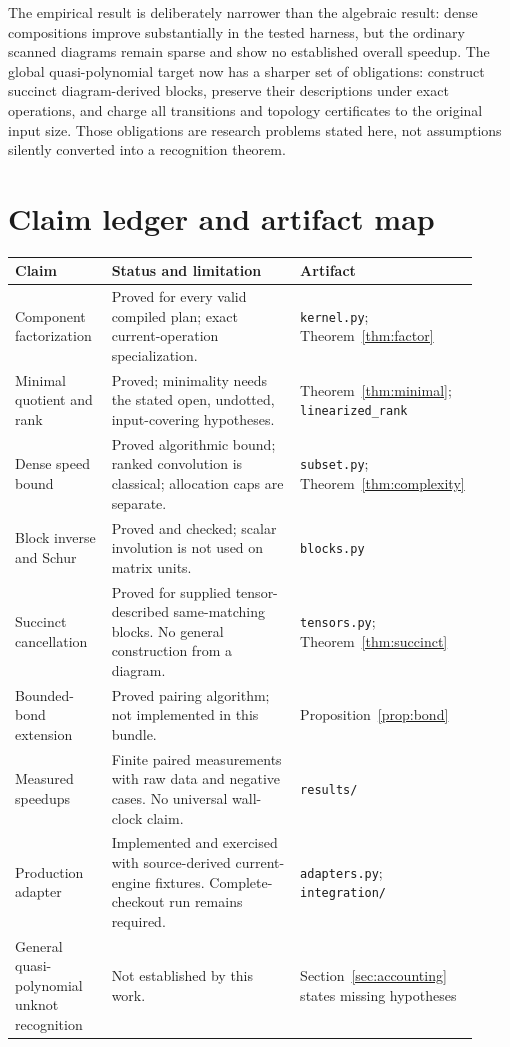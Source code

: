 \documentclass[11pt]{article}
\theoremstyle{definition}\newtheorem{definition}[theorem]{Definition}
\theoremstyle{remark}\newtheorem{remark}[theorem]{Remark}
\newcommand{\code}[1]{\texttt{#1}}
\begin{document}
The empirical result is deliberately narrower than the algebraic result: dense compositions improve substantially in the tested harness, but the ordinary scanned diagrams remain sparse and show no established overall speedup. The global quasi-polynomial target now has a sharper set of obligations: construct succinct diagram-derived blocks, preserve their descriptions under exact operations, and charge all transitions and topology certificates to the original input size. Those obligations are research problems stated here, not assumptions silently converted into a recognition theorem.

\appendix
\section{Claim ledger and artifact map}
\begin{longtable}{>{\raggedright\arraybackslash}p{0.21\linewidth}>{\raggedright\arraybackslash}p{0.43\linewidth}>{\raggedright\arraybackslash}p{0.28\linewidth}}
\toprule
Claim & Status and limitation & Artifact\\
\midrule\endhead
Component factorization & Proved for every valid compiled plan; exact current-operation specialization. & \code{kernel.py}; Theorem~\ref{thm:factor}\\
Minimal quotient and rank & Proved; minimality needs the stated open, undotted, input-covering hypotheses. & Theorem~\ref{thm:minimal}; \code{linearized\_rank}\\
Dense speed bound & Proved algorithmic bound; ranked convolution is classical; allocation caps are separate. & \code{subset.py}; Theorem~\ref{thm:complexity}\\
Block inverse and Schur & Proved and checked; scalar involution is not used on matrix units. & \code{blocks.py}\\
Succinct cancellation & Proved for supplied tensor-described same-matching blocks. No general construction from a diagram. & \code{tensors.py}; Theorem~\ref{thm:succinct}\\
Bounded-bond extension & Proved pairing algorithm; not implemented in this bundle. & Proposition~\ref{prop:bond}\\
Measured speedups & Finite paired measurements with raw data and negative cases. No universal wall-clock claim. & \code{results/}\\
Production adapter & Implemented and exercised with source-derived current-engine fixtures. Complete-checkout run remains required. & \code{adapters.py}; \code{integration/}\\
General quasi-polynomial unknot recognition & Not established by this work. & Section~\ref{sec:accounting} states missing hypotheses\\
\bottomrule
\end{longtable}
\end{document}
